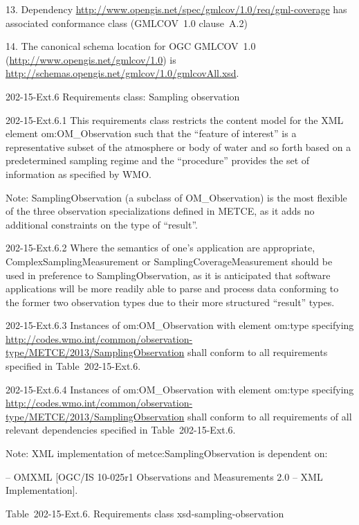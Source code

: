 13. Dependency \url{http://www.opengis.net/spec/gmlcov/1.0/req/gml-coverage} has associated conformance class (GMLCOV~1.0 clause~A.2)

14. The canonical schema location for OGC GMLCOV~1.0 (\url{http://www.opengis.net/gmlcov/1.0}) is \url{http://schemas.opengis.net/gmlcov/1.0/gmlcovAll.xsd}.

202-15-Ext.6 Requirements class: Sampling observation

202-15-Ext.6.1 This requirements class restricts the content model for the XML element om:OM\_Observation such that the ``feature of interest'' is a representative subset of the atmosphere or body of water and so forth based on a predetermined sampling regime and the ``procedure'' provides the set of information as specified by WMO.

Note: SamplingObservation (a subclass of OM\_Observation) is the most flexible of the three observation specializations defined in METCE, as it adds no additional constraints on the type of ``result''.

202-15-Ext.6.2 Where the semantics of one's application are appropriate, ComplexSamplingMeasurement or SamplingCoverageMeasurement should be used in preference to SamplingObservation, as it is anticipated that software applications will be more readily able to parse and process data conforming to the former two observation types due to their more structured ``result'' types.

202-15-Ext.6.3 Instances of om:OM\_Observation with element om:type specifying \url{http://codes.wmo.int/common/observation-type/METCE/2013/SamplingObservation} shall conform to all requirements specified in Table~202-15-Ext.6.

202-15-Ext.6.4 Instances of om:OM\_Observation with element om:type specifying \url{http://codes.wmo.int/common/observation-type/METCE/2013/SamplingObservation} shall conform to all requirements of all relevant dependencies specified in Table~202-15-Ext.6.

Note: XML implementation of metce:SamplingObservation is dependent on:

-- OMXML {[}OGC/IS 10-025r1 Observations and Measurements 2.0 -- XML Implementation{]}.

Table~202-15-Ext.6. Requirements class xsd-sampling-observation


